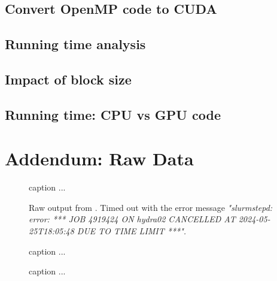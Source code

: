\documentclass[a4paper,%
11pt,%
DIV12,
headsepline,%
headings=normal,
]{scrartcl}
\begin{document}
\subsection{Convert OpenMP code to CUDA}

\subsection{Running time analysis}

\subsection{Impact of block size}

\subsection{Running time: CPU vs GPU code}

\newpage

\section{Addendum: Raw Data}

\begin{figure}[htbp]
    \centering
    \label{tab:filter_strong}
    \caption{caption ...}
\end{figure}

\begin{figure}[htbp]
    \centering
    \label{tab:filter_weak}
    \caption{Raw output from . Timed out with the error message \textit{"slurmstepd: error: *** JOB 4919424 ON hydra02 CANCELLED AT 2024-05-25T18:05:48 DUE TO TIME LIMIT ***".}}
\end{figure}

\begin{figure}[htbp]
    \centering
    \label{tab:juliap}
    \caption{caption ...}
\end{figure}

\begin{figure}[htbp]
    \centering
    \label{tab:juliap2}
    \caption{caption ...}
\end{figure}
\end{document}
